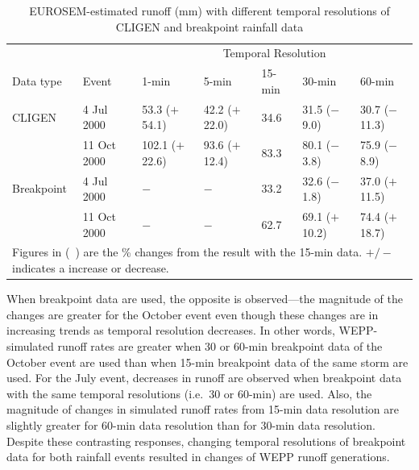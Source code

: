 \begin{table}[htbp]
  \centering
  \footnotesize
  \caption[EUROSEM-estimated runoff (mm) with different temporal resolutions of
CLIGEN and breakpoint rainfall data]{EUROSEM-estimated runoff (mm) with
different temporal resolutions of CLIGEN and breakpoint rainfall data}
\label{tab:DifferentTemporalScalesOfRainfallDataOnEUROSEMRunoffEstimation}
    \begin{tabular}{lllllll}
      \toprule
      & & \multicolumn{5}{c}{Temporal Resolution}\\
      \cmidrule{3-7}
      Data type & Event & 1-min & 5-min & 15-min & 30-min & 60-min \\
      \midrule
      CLIGEN & 4 Jul 2000 & 53.3 ($+$54.1) & 42.2 ($+$22.0) & 34.6 & 31.5
($-$9.0) & 30.7 ($-$11.3) \\
       & 11 Oct 2000 & 102.1 ($+$22.6) & 93.6 ($+$12.4) & 83.3 & 80.1 ($-$3.8) &
75.9 ($-$8.9) \\
       \midrule
      Breakpoint & 4 Jul 2000 & $-$ & $-$ & 33.2 & 32.6 ($-$1.8) & 37.0
($+$11.5) \\
       & 11 Oct 2000 & $-$ & $-$ & 62.7 & 69.1 ($+$10.2) & 74.4 ($+$18.7)\\
      \bottomrule
      \multicolumn{7}{p{12cm}}{\footnotesize Figures in (\ ) are the \% changes
from the result with the 15-min data. $+/-$ indicates a increase or decrease.}\\
    \end{tabular}
\end{table}

When breakpoint data are used, the opposite is observed---the magnitude of the
changes are greater for the October event even though these changes are in
increasing trends as temporal resolution decreases. In other words,
WEPP-simulated runoff rates are greater when 30 or 60-min breakpoint data of the
October event are used than when 15-min breakpoint data of the same storm are
used. For the July event, decreases in
runoff are observed when breakpoint data with the same temporal resolutions
(i.e.\
30 or 60-min) are used. Also, the magnitude of changes in simulated runoff
rates from 15-min data resolution are slightly greater for 60-min data
resolution than for
30-min data resolution. Despite these contrasting responses, changing temporal
resolutions
of breakpoint data for both rainfall events resulted in changes of WEPP runoff
generations.

